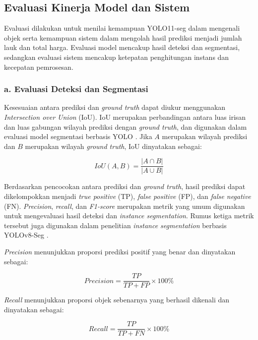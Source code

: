 \subsection{Evaluasi Kinerja Model dan Sistem}

Evaluasi dilakukan untuk menilai kemampuan YOLO11-seg dalam mengenali objek serta kemampuan sistem dalam mengolah hasil prediksi menjadi jumlah lauk dan total harga. Evaluasi model mencakup hasil deteksi dan segmentasi, sedangkan evaluasi sistem mencakup ketepatan penghitungan instans dan kecepatan pemrosesan.

\subsubsection*{a. Evaluasi Deteksi dan Segmentasi}

Kesesuaian antara prediksi dan \textit{ground truth} dapat diukur menggunakan \textit{Intersection over Union} (IoU). IoU merupakan perbandingan antara luas irisan dan luas gabungan wilayah prediksi dengan \textit{ground truth}, dan digunakan dalam evaluasi model segmentasi berbasis YOLO \cite{qiu2025}. Jika $A$ merupakan wilayah prediksi dan $B$ merupakan wilayah \textit{ground truth}, IoU dinyatakan sebagai:

\begin{equation}
    IoU(A,B) = \frac{|A \cap B|}{|A \cup B|}
    \label{eq:iou}
\end{equation}

Berdasarkan pencocokan antara prediksi dan \textit{ground truth}, hasil prediksi dapat dikelompokkan menjadi \textit{true positive} (TP), \textit{false positive} (FP), dan \textit{false negative} (FN). \textit{Precision}, \textit{recall}, dan \textit{F1-score} merupakan metrik yang umum digunakan untuk mengevaluasi hasil deteksi dan \textit{instance segmentation}. Rumus ketiga metrik tersebut juga digunakan dalam penelitian \textit{instance segmentation} berbasis YOLOv8-Seg \cite{yue2023}.

\textit{Precision} menunjukkan proporsi prediksi positif yang benar dan dinyatakan sebagai:

\begin{equation}
    \textit{Precision} = \frac{TP}{TP + FP}\times 100\%
    \label{eq:precision}
\end{equation}

\textit{Recall} menunjukkan proporsi objek sebenarnya yang berhasil dikenali dan dinyatakan sebagai:

\begin{equation}
    \textit{Recall} = \frac{TP}{TP + FN}\times 100\%
    \label{eq:recall}
\end{equation}

